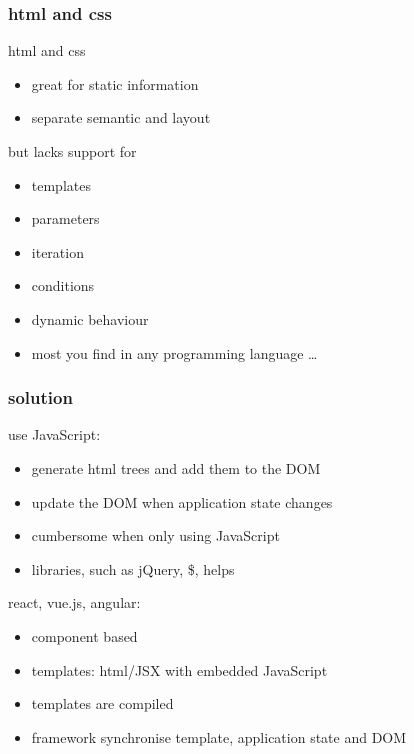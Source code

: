 \begin{frame}[fragile] \frametitle{html and css}
html and css
\begin{itemize}
  \item great for static information
  \item separate semantic and layout
\end{itemize}
but lacks support for
\begin{itemize}
  \item templates
  \item parameters
  \item iteration
  \item conditions
  \item dynamic behaviour
  \item most you find in any programming language \ldots
\end{itemize}
\end{frame}

\begin{frame}[fragile] \frametitle{solution}
use JavaScript:
\begin{itemize}
  \item generate html trees and add them to the DOM
  \item update the DOM when application state changes
  \item cumbersome when only using JavaScript
  \item libraries, such as jQuery, \$, helps
\end{itemize}
\vspace{4mm}
react, vue.js, angular:
\begin{itemize}
  \item component based
  \item templates: html/JSX with embedded JavaScript
  \item templates are compiled
  \item framework synchronise template, application state and DOM
\end{itemize}
\end{frame}

\begin{frame}[fragile] \frametitle{}
\end{frame}

